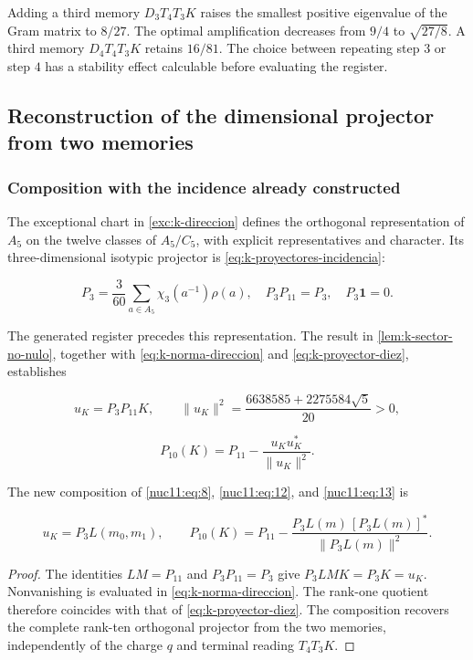 Adding a third memory \(D_3T_4T_3K\) raises the smallest positive eigenvalue of the Gram matrix to \(8/27\). The optimal amplification decreases from \(9/4\) to \(\sqrt{27/8}\). A third memory \(D_4T_4T_3K\) retains \(16/81\). The choice between repeating step \(3\) or step \(4\) has a stability effect calculable before evaluating the register.

\subsection{Reconstruction of the dimensional projector from two memories}

\subsubsection{Composition with the incidence already constructed}

The exceptional chart in \cref{exc:k-direccion} defines the orthogonal representation of \(A_5\) on the twelve classes of \(A_5/C_5\), with explicit representatives and character. Its three-dimensional isotypic projector is \eqref{eq:k-proyectores-incidencia}:

\begin{equation}
P_3=\frac3{60}\sum_{a\in A_5}\chi_3(a^{-1})\rho(a),
\quad P_3P_{11}=P_3,\quad P_3\mathbf1=0.
\label{nuc11:eq:12}
\end{equation}

The generated register precedes this representation. The result in \cref{lem:k-sector-no-nulo}, together with \eqref{eq:k-norma-direccion} and \eqref{eq:k-proyector-diez}, establishes

\[
u_K=P_3P_{11}K,\qquad
\|u_K\|^2=\frac{6638585+2275584\sqrt5}{20}>0,
\]

\begin{equation}
P_{10}(K)=P_{11}-\frac{u_Ku_K^*}{\|u_K\|^2}.
\label{nuc11:eq:13}
\end{equation}

The new composition of \eqref{nuc11:eq:8}, \eqref{nuc11:eq:12}, and \eqref{nuc11:eq:13} is

\begin{equation}
\boxed{
u_K=P_3L(m_0,m_1),\qquad
P_{10}(K)=P_{11}-
\frac{P_3L(m)\,[P_3L(m)]^*}{\|P_3L(m)\|^2}.
}
\label{nuc11:eq:14}
\end{equation}

\begin{proof}
The identities \(LM=P_{11}\) and \(P_3P_{11}=P_3\) give \(P_3LMK=P_3K=u_K\). Nonvanishing is evaluated in \eqref{eq:k-norma-direccion}. The rank-one quotient therefore coincides with that of \eqref{eq:k-proyector-diez}. The composition recovers the complete rank-ten orthogonal projector from the two memories, independently of the charge \(q\) and terminal reading \(T_4T_3K\).
\end{proof}

